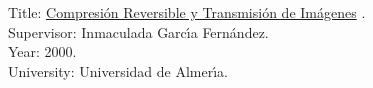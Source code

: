 Title:
\href{http://www.hpca.ual.es/~vruiz/papers/tesis.pdf}{Compresi\'on Reversible y Transmisi\'on de Im\'agenes} .\\
Supervisor: Inmaculada Garc\'{\i}a Fern\'andez. \\
Year: 2000. \\
University: Universidad de Almer\'{\i}a.
